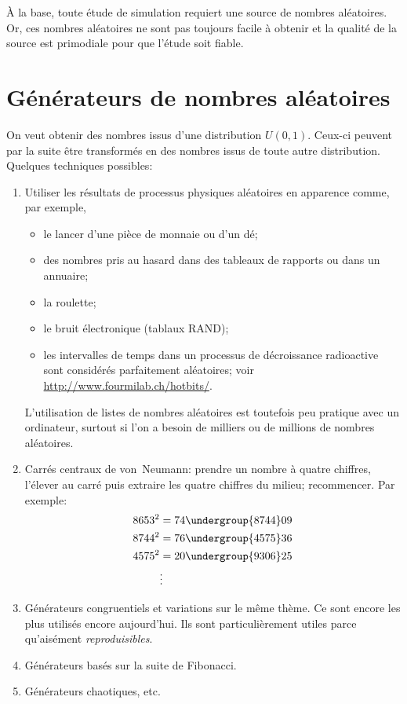 À la base, toute étude de simulation requiert une source de nombres
aléatoires. Or, ces nombres aléatoires ne sont pas toujours facile à
obtenir et la qualité de la source est primodiale pour que l'étude
soit fiable.



\section{Générateurs de nombres aléatoires}
\label{sec:generation:generateurs}

On veut obtenir des nombres issus d'une distribution $U(0, 1)$.
Ceux-ci peuvent par la suite être transformés en des nombres issus de
toute autre distribution. Quelques techniques possibles:
\begin{enumerate}
\item Utiliser les résultats de processus physiques aléatoires en
  apparence comme, par exemple,
  \begin{itemize}
  \item le lancer d'une pièce de monnaie ou d'un dé;
  \item des nombres pris au hasard dans des tableaux de rapports ou
    dans un annuaire;
  \item la roulette;
  \item le bruit électronique (tablaux RAND);
  \item les intervalles de temps dans un processus de décroissance
    radioactive sont considérés parfaitement aléatoires; voir
    \url{http://www.fourmilab.ch/hotbits/}.
  \end{itemize}
  L'utilisation de listes de nombres aléatoires est toutefois peu
  pratique avec un ordinateur, surtout si l'on a besoin de milliers ou
  de millions de nombres aléatoires.
\item Carrés centraux de von~Neumann: prendre un nombre à quatre
  chiffres, l'élever au carré puis extraire les quatre chiffres du
  milieu; recommencer. Par exemple:
  \begin{align*}
    8653^2 &= 74\undergroup{8744}09 \\
    8744^2 &= 76\undergroup{4575}36 \\
    4575^2 &= 20\undergroup{9306}25 \\
    &\vdots
  \end{align*}
\item Générateurs congruentiels et variations sur le même thème. Ce
  sont encore les plus utilisés encore aujourd'hui. Ils sont
  particulièrement utiles parce qu'aisément \emph{reproduisibles}.
\item Générateurs basés sur la suite de Fibonacci.
\item Générateurs chaotiques, etc.
\end{enumerate}

